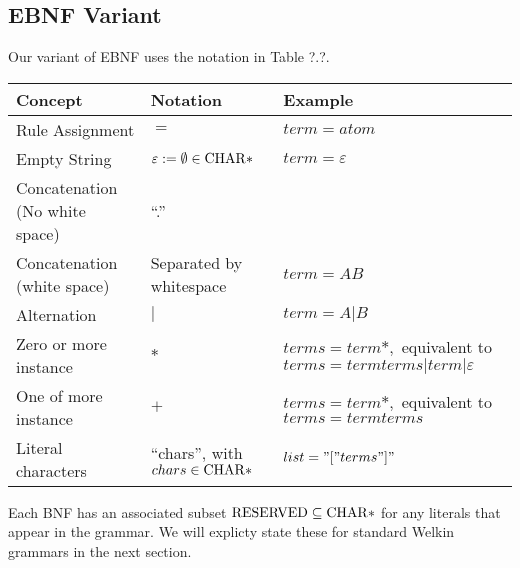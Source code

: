\subsection{EBNF Variant}
Our variant of EBNF uses the notation in Table ?.?.
\begin{center}
\begin{tabular}{ | m{3cm} | m{5cm} | m{5cm} | }
	\hline
  Concept & Notation & Example \\
  \hline
	Rule Assignment & $=$ & $term = atom$\\
  Empty String & $\varepsilon := \emptyset \in \mathrm{CHAR}*$ & $term = \varepsilon$ \\
  Concatenation (No white space) & ``.'' & \\
	Concatenation (white space) & Separated by whitespace & $term = A B$ \\
	Alternation & $|$ & $term = A | B$\\
	Zero or more instance & $*$ & $terms = term*,$ equivalent to $terms = term terms | term | \varepsilon$ \\
	One of more instance & $+$ & $terms = term*,$ equivalent to $terms = term terms$ \\
  Literal characters & ``chars'', with $chars \in \mathrm{CHAR}*$ & $list = "[" terms "]"$ \\
  \hline
\end{tabular}
\end{center}
Each BNF has an associated subset $\mathrm{RESERVED} \subseteq \mathrm{CHAR}*$ for any literals that appear in the grammar. We will explicty state these for standard Welkin grammars in the next section.
